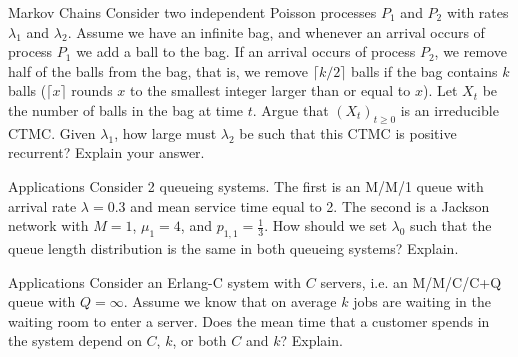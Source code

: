 \begin{problem}{Markov Chains}
Consider two independent Poisson processes \( P_1 \) and \( P_2 \) with rates \( \lambda_1 \) and \( \lambda_2 \). Assume we have an infinite bag, and whenever an arrival occurs of process \( P_1 \) we add a ball to the bag. If an arrival occurs of process \( P_2 \), we remove half of the balls from the bag, that is, we remove \( \lceil k/2 \rceil \) balls if the bag contains \( k \) balls (\( \lceil x \rceil \) rounds \( x \) to the smallest integer larger than or equal to \( x \)). Let \( X_t \) be the number of balls in the bag at time \( t \). Argue that \( (X_t)_{t \geq 0} \) is an irreducible CTMC. Given \( \lambda_1 \), how large must \( \lambda_2 \) be such that this CTMC is positive recurrent? Explain your answer.
\end{problem}

\begin{problem}{Applications}
Consider 2 queueing systems. The first is an M/M/1 queue with arrival rate \( \lambda = 0.3 \) and mean service time equal to 2. The second is a Jackson network with \( M = 1 \), \( \mu_1 = 4 \), and \( p_{1,1} = \frac{1}{3} \). How should we set \( \lambda_0 \) such that the queue length distribution is the same in both queueing systems? Explain.
\end{problem}

\begin{problem}{Applications}
Consider an Erlang-C system with \( C \) servers, i.e. an M/M/C/C+Q queue with \( Q = \infty \). Assume we know that on average \( k \) jobs are waiting in the waiting room to enter a server. Does the mean time that a customer spends in the system depend on \( C \), \( k \), or both \( C \) and \( k \)? Explain.
\end{problem}
